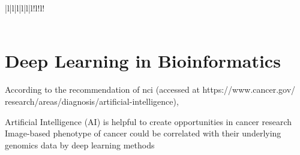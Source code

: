 \documentclass[12pt, a4paper]{article}
\begin{document}
\begin{table}[!hp]
{\begin{tabular}{|l|l|l|l|l|l!{\color{black}\vrule}l!{\color{black}\vrule}l!{\color{black}\vrule}}
                                                                                                                                                                                                                                                                                                                                                                                                                                                                                                \\ 
\hline
{}                                                                                                                                                                                                                                                                                                                                                                                                    \\
\hline
\end{tabular}
}%
{}
\label{table:table4}
\end{table}










\clearpage

\section{Deep Learning in Bioinformatics}

According to the recommendation of \acrfull{nci} (accessed at https://www.cancer.gov/\\research/areas/diagnosis/artificial-intelligence), 
\begin{outline}
\1 Artificial Intelligence (AI) is helpful to create opportunities in cancer research
\1 Image-based phenotype of cancer could be correlated with their underlying genomics data by deep learning methods
\end{outline}
\end{document}
